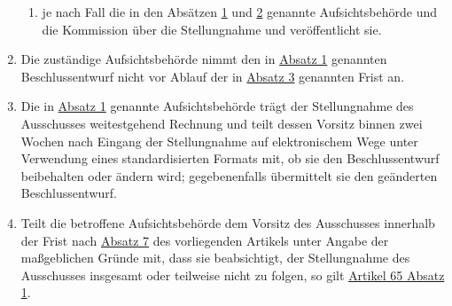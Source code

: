 \begin{enumerate}
\begin{enumerate}
    \item je nach Fall die in den Absätzen \hyperref[itm:64-1]{1} und \hyperref[itm:64-2]{2} genannte Aufsichtsbehörde
     und die Kommission über die Stellungnahme und veröffentlicht sie.
    \label{itm:64-5b}

  \end{enumerate}

  \item Die zuständige Aufsichtsbehörde nimmt den in \hyperref[itm:64-1]{Absatz 1} genannten Beschlussentwurf nicht vor
   Ablauf der in \hyperref[itm:64-3]{Absatz 3} genannten Frist an.
  \label{itm:64-6}

  \item Die in \hyperref[itm:64-1]{Absatz 1} genannte Aufsichtsbehörde trägt der Stellungnahme des Ausschusses
   weitestgehend Rechnung und teilt dessen Vorsitz binnen zwei Wochen nach Eingang der Stellungnahme auf elektronischem
   Wege unter Verwendung eines standardisierten Formats mit, ob sie den Beschlussentwurf beibehalten oder ändern wird;
   gegebenenfalls übermittelt sie den geänderten Beschlussentwurf.
  \label{itm:64-7}

  \item Teilt die betroffene Aufsichtsbehörde dem Vorsitz des Ausschusses innerhalb der Frist nach \hyperref[itm:64-7]
   {Absatz 7} des vorliegenden Artikels unter Angabe der maßgeblichen Gründe mit, dass sie beabsichtigt, der
   Stellungnahme des Ausschusses insgesamt oder teilweise nicht zu folgen, so gilt \hyperref[itm:65-2]{Artikel 65
   Absatz 1}.
  \label{itm:64-8}

\end{enumerate}


